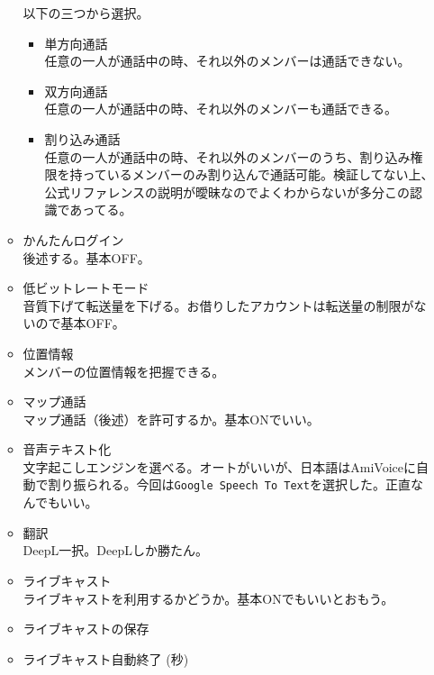 \documentclass[dvipdfmx,jb5]{jreport}
\newcommand{\terlogy}[2][|]{\colorbox{terlogy}{\texttt{\lstinline#1#2#1}}}
\begin{document}
\begin{itemize}
\begin{itemize}
                        以下の三つから選択。
                        \begin{itemize}
                              \item 単方向通話\\
                                    任意の一人が通話中の時、それ以外のメンバーは通話できない。
                              \item 双方向通話\\
                                    任意の一人が通話中の時、それ以外のメンバーも通話できる。
                              \item 割り込み通話\\
                                    任意の一人が通話中の時、それ以外のメンバーのうち、割り込み権限を持っているメンバーのみ割り込んで通話可能。検証してない上、公式リファレンスの説明が曖昧なのでよくわからないが多分この認識であってる。
                        \end{itemize}
                  \item かんたんログイン\\
                        後述する。基本OFF。
                  \item 低ビットレートモード\\
                        音質下げて転送量を下げる。お借りしたアカウントは転送量の制限がないので基本OFF。
                  \item 位置情報\\
                        メンバーの位置情報を把握できる。
                  \item マップ通話\\
                        マップ通話（後述）を許可するか。基本ONでいい。
                  \item 音声テキスト化\\
                        文字起こしエンジンを選べる。オートがいいが、日本語はAmiVoiceに自動で割り振られる。今回は\terlogy{Google Speech To Text}を選択した。正直なんでもいい。
                  \item 翻訳\\
                        DeepL一択。DeepLしか勝たん。
                  \item ライブキャスト\\
                        ライブキャストを利用するかどうか。基本ONでもいいとおもう。
                  \item ライブキャストの保存
                  \item ライブキャスト自動終了 (秒)

\end{itemize}
\end{itemize}
\end{document}
